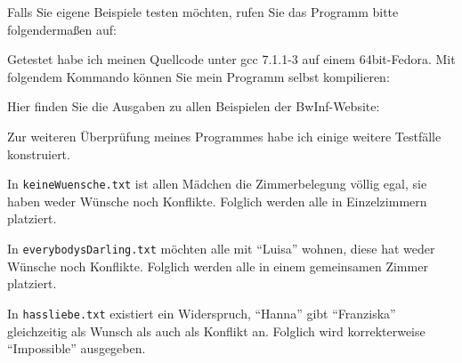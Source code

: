 Falls Sie eigene Beispiele testen möchten,
rufen Sie das Programm bitte folgendermaßen auf:


Getestet habe ich meinen Quellcode unter gcc 7.1.1-3 auf einem 64bit-Fedora.
Mit folgendem Kommando können Sie mein Programm selbst kompilieren:


Hier finden Sie die Ausgaben zu allen Beispielen der BwInf-Website:








Zur weiteren Überprüfung meines Programmes habe ich einige weitere Testfälle konstruiert.

In \texttt{keineWuensche.txt} ist allen Mädchen die Zimmerbelegung völlig egal,
sie haben weder Wünsche noch Konflikte.
Folglich werden alle in Einzelzimmern platziert.


In \texttt{everybodysDarling.txt} möchten alle mit "`Luisa"' wohnen,
diese hat weder Wünsche noch Konflikte.
Folglich werden alle in einem gemeinsamen Zimmer platziert.


In \texttt{hassliebe.txt} existiert ein Widerspruch, "`Hanna"' gibt "`Franziska"'
gleichzeitig als Wunsch als auch als Konflikt an.
Folglich wird korrekterweise "`Impossible"' ausgegeben.

